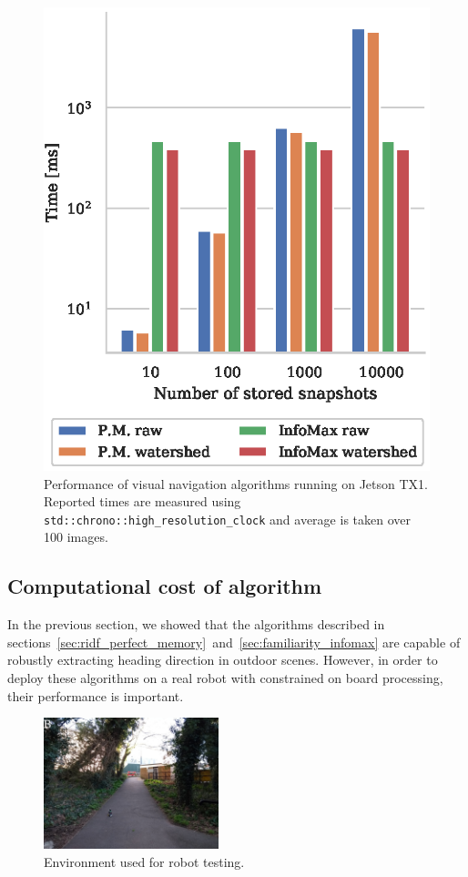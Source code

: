 \documentclass[letterpaper]{article}
\begin{document}
\begin{figure}[t]
    \centering
    \includegraphics{figures/jetson_test_performance.eps}
    \caption{Performance of visual navigation algorithms running on Jetson TX1. 
    Reported times are measured using \lstinline{std::chrono::high_resolution_clock} and average is taken over \num{100} images.}
    \label{fig:jetson_test_performance}
\end{figure}

\subsection{Computational cost of algorithm}
In the previous section, we showed that the algorithms described in sections~\ref{sec:ridf_perfect_memory}~and~\ref{sec:familiarity_infomax} are capable of robustly extracting heading direction in outdoor scenes. 
However, in order to deploy these algorithms on a real robot with constrained on board processing, their performance is important. 

\begin{figure}[t]
    \centering
    \includegraphics[width=2in]{figures/robot_environment.jpg}
    \caption{Environment used for robot testing.}
    \label{fig:robot_environment}
\end{figure}
\end{document}
